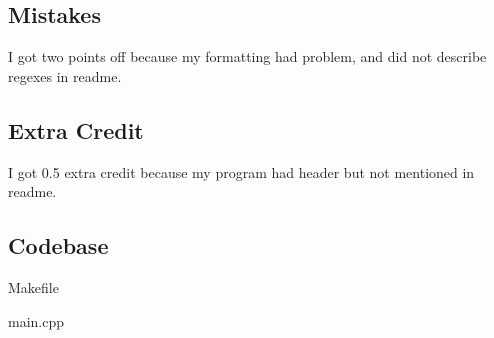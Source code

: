 \subsection{Mistakes}\label{sec:ps7:Mistakes}

I got two points off because my formatting had problem, and did not describe regexes in readme.

\subsection{Extra Credit}\label{sec:ps7:Extra Credit}

I got 0.5 extra credit because my program had header but not mentioned in readme.

\subsection{Codebase}\label{sec:ps7:code}
Makefile

main.cpp


\newpage
